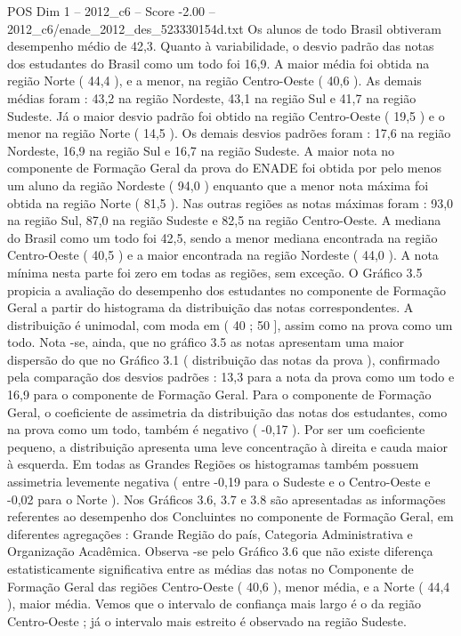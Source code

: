 \begin{textsample}{POS Dim 1 – 2012\_c6 – Score -2.00 – 2012\_c6/enade\_2012\_des\_523330154d.txt}
Os alunos de todo Brasil obtiveram desempenho médio de 42,3.
Quanto à variabilidade, o desvio padrão das notas dos estudantes do Brasil como um todo foi 16,9.
A maior média foi obtida na região Norte ( 44,4 ), e a menor, na região Centro-Oeste ( 40,6 ).
As demais médias foram : 43,2 na região Nordeste, 43,1 na região Sul e 41,7 na região Sudeste.
Já o maior desvio padrão foi obtido na região Centro-Oeste ( 19,5 ) e o menor na região Norte ( 14,5 ).
Os demais desvios padrões foram : 17,6 na região Nordeste, 16,9 na região Sul e 16,7 na região Sudeste.
A maior nota no componente de Formação Geral da prova do ENADE foi obtida por pelo menos um aluno da região Nordeste ( 94,0 ) enquanto que a menor nota máxima foi obtida na região Norte ( 81,5 ).
Nas outras regiões as notas máximas foram : 93,0 na região Sul, 87,0 na região Sudeste e 82,5 na região Centro-Oeste.
A mediana do Brasil como um todo foi 42,5, sendo a menor mediana encontrada na região Centro-Oeste ( 40,5 ) e a maior encontrada na região Nordeste ( 44,0 ).
A nota mínima nesta parte foi zero em todas as regiões, sem exceção.
O Gráfico 3.5 propicia a avaliação do desempenho dos estudantes no componente de Formação Geral a partir do histograma da distribuição das notas correspondentes.
A distribuição é unimodal, com moda em ( 40 ; 50 ], assim como na prova como um todo.
Nota -se, ainda, que no gráfico 3.5 as notas apresentam uma maior dispersão do que no Gráfico 3.1 ( distribuição das notas da prova ), confirmado pela comparação dos desvios padrões : 13,3 para a nota da prova como um todo e 16,9 para o componente de Formação Geral.
Para o componente de Formação Geral, o coeficiente de assimetria da distribuição das notas dos estudantes, como na prova como um todo, também é negativo ( -0,17 ).
Por ser um coeficiente pequeno, a distribuição apresenta uma leve concentração à direita e cauda maior à esquerda.
Em todas as Grandes Regiões os histogramas também possuem assimetria levemente negativa ( entre -0,19 para o Sudeste e o Centro-Oeste e -0,02 para o Norte ).
Nos Gráficos 3.6, 3.7 e 3.8 são apresentadas as informações referentes ao desempenho dos Concluintes no componente de Formação Geral, em diferentes agregações : Grande Região do país, Categoria Administrativa e Organização Acadêmica.
Observa -se pelo Gráfico 3.6 que não existe diferença estatisticamente significativa entre as médias das notas no Componente de Formação Geral das regiões Centro-Oeste ( 40,6 ), menor média, e a Norte ( 44,4 ), maior média.
Vemos que o intervalo de confiança mais largo é o da região Centro-Oeste ; já o intervalo mais estreito é observado na região Sudeste.

\end{textsample}
